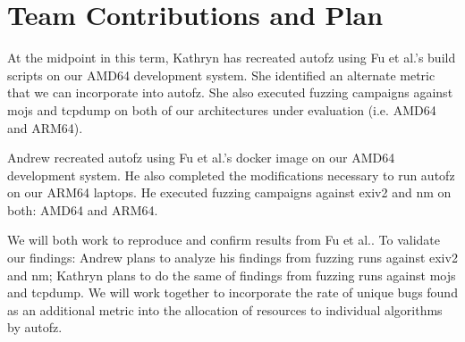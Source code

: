 \section{Team Contributions and Plan}

At the midpoint in this term, Kathryn has recreated autofz using Fu et al.\cite{Fu}'s build scripts
on our AMD64 development system. She identified an alternate metric that we can incorporate into
autofz. She also executed fuzzing campaigns against mojs and tcpdump on both of our architectures
under evaluation (i.e. AMD64 and ARM64).

Andrew recreated autofz using Fu et al.\cite{Fu}'s docker image on our AMD64 development system.
He also completed the modifications necessary to run autofz on our ARM64 laptops. He executed fuzzing
campaigns against exiv2 and nm on both: AMD64 and ARM64.

We will both work to reproduce and confirm results from Fu et al.\cite{Fu}. To validate our findings:
Andrew plans to analyze his findings from fuzzing runs against exiv2 and nm; Kathryn plans to do the
same of findings from fuzzing runs against mojs and tcpdump. We will work together to incorporate
the rate of unique bugs found as an additional metric into the allocation of resources to individual
algorithms by autofz.










